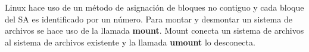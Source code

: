 Linux hace uso de un método de asignación de bloques no contiguo y cada bloque del SA es identificado por un número. Para montar y desmontar un sistema de archivos se hace uso de la llamada \textbf{mount}. Mount conecta un sistema de archivos al sistema de archivos existente y la llamada \textbf{umount} lo desconecta.
